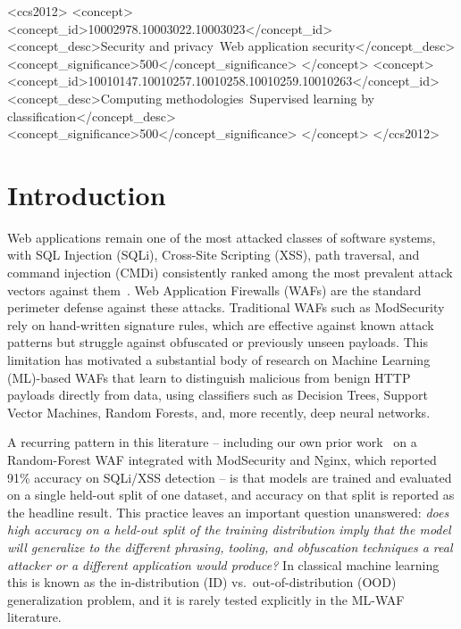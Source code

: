 \documentclass[sigconf]{acmart}
\begin{document}
\begin{CCSXML}
<ccs2012>
   <concept>
       <concept_id>10002978.10003022.10003023</concept_id>
       <concept_desc>Security and privacy~Web application security</concept_desc>
       <concept_significance>500</concept_significance>
       </concept>
   <concept>
       <concept_id>10010147.10010257.10010258.10010259.10010263</concept_id>
       <concept_desc>Computing methodologies~Supervised learning by classification</concept_desc>
       <concept_significance>500</concept_significance>
       </concept>
 </ccs2012>
\end{CCSXML}



\maketitle

\section{Introduction}

Web applications remain one of the most attacked classes of software systems,
with SQL Injection (SQLi), Cross-Site Scripting (XSS), path traversal, and
command injection (CMDi) consistently ranked among the most prevalent attack
vectors against them~\cite{owasp}. Web Application Firewalls (WAFs) are the
standard perimeter defense against these attacks. Traditional WAFs such as
ModSecurity~\cite{modsecurity} rely on hand-written signature rules, which are
effective against known attack patterns but struggle against obfuscated or
previously unseen payloads. This limitation has motivated a substantial body
of research on Machine Learning (ML)-based WAFs that learn to distinguish
malicious from benign HTTP payloads directly from data, using classifiers such
as Decision Trees, Support Vector Machines, Random Forests, and, more
recently, deep neural networks.

A recurring pattern in this literature -- including our own prior
work~\cite{ourprior} on a Random-Forest WAF integrated with ModSecurity and
Nginx, which reported 91\% accuracy on SQLi/XSS detection -- is that models
are trained and evaluated on a single held-out split of one dataset, and
accuracy on that split is reported as the headline result. This practice
leaves an important question unanswered: \emph{does high accuracy on a
held-out split of the training distribution imply that the model will
generalize to the different phrasing, tooling, and obfuscation techniques a
real attacker or a different application would produce?} In classical machine
learning this is known as the in-distribution (ID) vs.\ out-of-distribution
(OOD) generalization problem, and it is rarely tested explicitly in the
ML-WAF literature.
\end{document}
